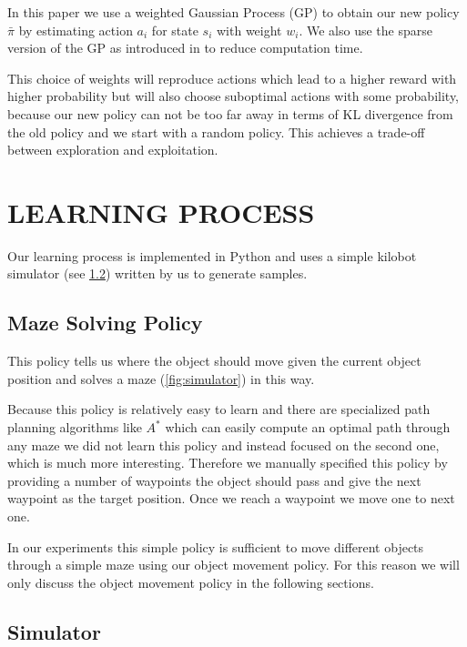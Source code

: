 \documentclass[twoside]{article}
\begin{document}
In this paper we use a weighted Gaussian Process (GP) to obtain our new policy
$\bar{\pi}$ by estimating action $a_i$ for state $s_i$ with weight $w_i$. We
also use the sparse version of the GP as introduced in \cite{sparsegp} to reduce
computation time.

This choice of weights will reproduce actions which lead to a higher reward with
higher probability but will also choose suboptimal actions with some
probability, because our new policy can not be too far away in terms of KL
divergence from the old policy and we start with a random policy. This achieves
a trade-off between exploration and exploitation.

\section{LEARNING PROCESS}

Our learning process is implemented in Python and uses a simple kilobot
simulator (see \ref{sec:simulator}) written by us to generate samples.

\subsection{Maze Solving Policy}
This policy tells us where the object should move given the current object
position and solves a maze (\autoref{fig:simulator}) in this way.

Because this policy is relatively easy to learn and there are specialized path
planning algorithms like $A^*$ which can easily compute an optimal path through
any maze we did not learn this policy and instead focused on the second one,
which is much more interesting. Therefore we manually specified this policy by
providing a number of waypoints the object should pass and give the next
waypoint as the target position. Once we reach a waypoint we move one to next
one.

In our experiments this simple policy is sufficient to move different objects
through a simple maze using our object movement policy. For this reason we will
only discuss the object movement policy in the following sections.

\subsection{Simulator}
\label{sec:simulator}

\newcommand\nkb{\#\mathit{kb}}
\newcommand\nep{\#\mathit{ep}}
\newcommand\nst{\#\mathit{st}}
\end{document}
